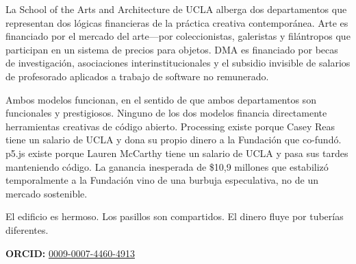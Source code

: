 \documentclass[10pt,letterpaper,twocolumn]{article}
\newcommand{\dma}{\textsc{DMA}}
\begin{document}
La School of the Arts and Architecture de UCLA alberga dos departamentos que representan dos lógicas financieras de la práctica creativa contemporánea. Arte es financiado por el mercado del arte---por coleccionistas, galeristas y filántropos que participan en un sistema de precios para objetos. \dma{} es financiado por becas de investigación, asociaciones interinstitucionales y el subsidio invisible de salarios de profesorado aplicados a trabajo de software no remunerado.

Ambos modelos funcionan, en el sentido de que ambos departamentos son funcionales y prestigiosos. Ninguno de los dos modelos financia directamente herramientas creativas de código abierto. Processing existe porque Casey Reas tiene un salario de UCLA y dona su propio dinero a la Fundación que co-fundó. p5.js existe porque Lauren McCarthy tiene un salario de UCLA y pasa sus tardes manteniendo código. La ganancia inesperada de \$10,9 millones que estabilizó temporalmente a la Fundación vino de una burbuja especulativa, no de un mercado sostenible.

El edificio es hermoso. Los pasillos son compartidos. El dinero fluye por tuberías diferentes.

\vspace{0.5em}
\noindent\textbf{ORCID:} \href{https://orcid.org/0009-0007-4460-4913}{0009-0007-4460-4913}



\end{document}
